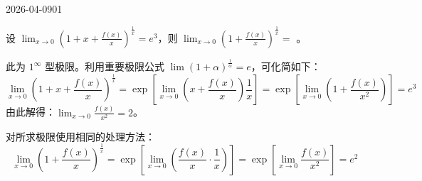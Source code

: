 \begin{mistake}{2026-04-09}{01}

\begin{problemcontent}
设 \(\lim_{x \to 0} \left(1 + x + \frac{f(x)}{x}\right)^{\frac{1}{x}} = e^3\)，则 \(\lim_{x \to 0} \left(1 + \frac{f(x)}{x}\right)^{\frac{1}{x}} = \) \underline{\hspace{2em}}。
\end{problemcontent}

\begin{solutioncontent}
此为 \(1^\infty\) 型极限。利用重要极限公式 \(\lim (1+\alpha)^{\frac{1}{\alpha}} = e\)，可化简如下：
\[
\lim_{x \to 0} \left(1 + x + \frac{f(x)}{x}\right)^{\frac{1}{x}} = \exp\left[\lim_{x \to 0} \left(x + \frac{f(x)}{x}\right) \frac{1}{x}\right] = \exp\left[\lim_{x \to 0} \left(1 + \frac{f(x)}{x^2}\right)\right] = e^3
\]
由此解得：\(\lim_{x \to 0} \frac{f(x)}{x^2} = 2\)。

对所求极限使用相同的处理方法：
\[
\lim_{x \to 0} \left(1 + \frac{f(x)}{x}\right)^{\frac{1}{x}} = \exp\left[\lim_{x \to 0} \left(\frac{f(x)}{x} \cdot \frac{1}{x}\right)\right] = \exp\left[\lim_{x \to 0} \frac{f(x)}{x^2}\right] = e^2
\]
\end{solutioncontent}


\end{mistake}
